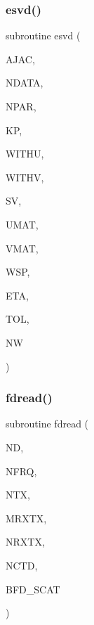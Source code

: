 \subsubsection{\texorpdfstring{esvd()}{esvd()}}
{\footnotesize\ttfamily subroutine esvd (\begin{DoxyParamCaption}\item[{real, dimension(ndata,npar+1)}]{A\+J\+AC,  }\item[{integer}]{N\+D\+A\+TA,  }\item[{integer}]{N\+P\+AR,  }\item[{integer}]{KP,  }\item[{logical}]{W\+I\+T\+HU,  }\item[{logical}]{W\+I\+T\+HV,  }\item[{real, dimension(npar)}]{SV,  }\item[{real, dimension(ndata,npar)}]{U\+M\+AT,  }\item[{real, dimension(npar,npar)}]{V\+M\+AT,  }\item[{real, dimension(3$\ast$npar)}]{W\+SP,  }\item[{real}]{E\+TA,  }\item[{real}]{T\+OL,  }\item[{integer}]{NW }\end{DoxyParamCaption})}

\mbox{\label{Leroi__c_8f90_a51b5dc154d226d9db8556fde47af7ae9}} 
\subsubsection{\texorpdfstring{fdread()}{fdread()}}
{\footnotesize\ttfamily subroutine fdread (\begin{DoxyParamCaption}\item[{integer}]{ND,  }\item[{integer}]{N\+F\+RQ,  }\item[{integer}]{N\+TX,  }\item[{integer}]{M\+R\+X\+TX,  }\item[{integer, dimension(ntx)}]{N\+R\+X\+TX,  }\item[{integer, dimension(mrxtx,ntx)}]{N\+C\+TD,  }\item[{complex, dimension(nfrq,mrxtx,ntx,3)}]{B\+F\+D\+\_\+\+S\+C\+AT }\end{DoxyParamCaption})}

